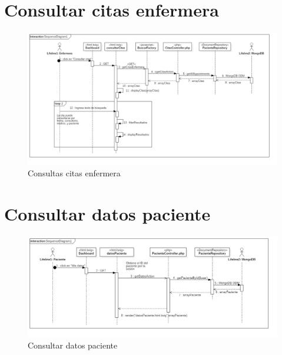 \newpage
\section{Consultar citas enfermera}
\begin{figure}[htbp!]
		\centering
			\includegraphics[width=1\textwidth]{uml/DiagramasSecuencia/Trujillo/getCitasEnfermera}
		\caption{Consultas citas enfermera}
	\end{figure}
	\newpage
\section{Consultar datos paciente}
\begin{figure}[htbp!]
		\centering
			\includegraphics[width=1\textwidth]{uml/DiagramasSecuencia/Trujillo/getDatosPaciente}
		\caption{Consultar datos paciente}
	\end{figure}
	\newpage
